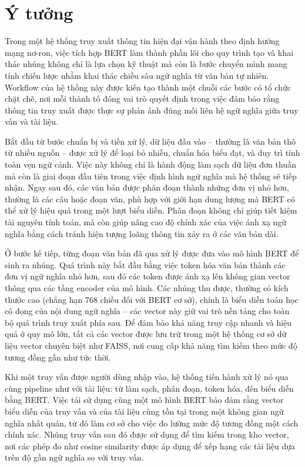 \section{Ý tưởng}
Trong một hệ thống truy xuất thông tin hiện đại vận hành theo định hướng mạng nơ-ron, việc tích hợp BERT làm thành phần lõi cho quy trình tạo và khai thác nhúng không chỉ là lựa chọn kỹ thuật mà còn là bước chuyển mình mang tính chiến lược nhằm khai thác chiều sâu ngữ nghĩa từ văn bản tự nhiên. Workflow của hệ thống này được kiến tạo thành một chuỗi các bước có tổ chức chặt chẽ, nơi mỗi thành tố đóng vai trò quyết định trong việc đảm bảo rằng thông tin truy xuất được thực sự phản ánh đúng mối liên hệ ngữ nghĩa giữa truy vấn và tài liệu.

Bắt đầu từ bước chuẩn bị và tiền xử lý, dữ liệu đầu vào -- thường là văn bản thô từ nhiều nguồn -- được xử lý để loại bỏ nhiễu, chuẩn hóa biểu đạt, và duy trì tính toàn vẹn ngữ cảnh. Việc này không chỉ là hành động làm sạch dữ liệu đơn thuần mà còn là giai đoạn đầu tiên trong việc định hình ngữ nghĩa mà hệ thống sẽ tiếp nhận. Ngay sau đó, các văn bản được phân đoạn thành những đơn vị nhỏ hơn, thường là các câu hoặc đoạn văn, phù hợp với giới hạn dung lượng mà BERT có thể xử lý hiệu quả trong một lượt biểu diễn. Phân đoạn không chỉ giúp tiết kiệm tài nguyên tính toán, mà còn giúp nâng cao độ chính xác của việc ánh xạ ngữ nghĩa bằng cách tránh hiện tượng loãng thông tin xảy ra ở các văn bản dài.

Ở bước kế tiếp, từng đoạn văn bản đã qua xử lý được đưa vào mô hình BERT để sinh ra nhúng. Quá trình này bắt đầu bằng việc token hóa văn bản thành các đơn vị ngữ nghĩa nhỏ hơn, sau đó các token được ánh xạ lên không gian vector thông qua các tầng encoder của mô hình. Các nhúng thu được, thường có kích thước cao (chẳng hạn 768 chiều đối với BERT cơ sở), chính là biểu diễn toán học cô đọng của nội dung ngữ nghĩa -- các vector này giữ vai trò nền tảng cho toàn bộ quá trình truy xuất phía sau. Để đảm bảo khả năng truy cập nhanh và hiệu quả ở quy mô lớn, tất cả các vector được lưu trữ trong một hệ thống cơ sở dữ liệu vector chuyên biệt như FAISS, nơi cung cấp khả năng tìm kiếm theo mức độ tương đồng gần như tức thời.

Khi một truy vấn được người dùng nhập vào, hệ thống tiến hành xử lý nó qua cùng pipeline như với tài liệu: từ làm sạch, phân đoạn, token hóa, đến biểu diễn bằng BERT. Việc tái sử dụng cùng một mô hình BERT bảo đảm rằng vector biểu diễn của truy vấn và của tài liệu cùng tồn tại trong một không gian ngữ nghĩa nhất quán, từ đó làm cơ sở cho việc đo lường mức độ tương đồng một cách chính xác. Nhúng truy vấn sau đó được sử dụng để tìm kiếm trong kho vector, nơi các phép đo như cosine similarity được áp dụng để xếp hạng các tài liệu dựa trên độ gần ngữ nghĩa so với truy vấn.

